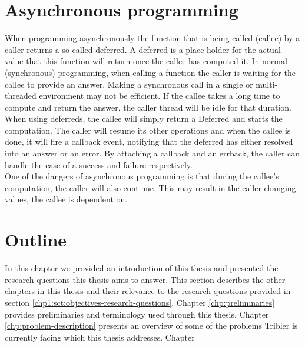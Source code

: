 \section{Asynchronous programming}
\label{sec:async-programming}

When programming asynchronously the function that is being called (callee) by a caller returns a so-called deferred.
A deferred is a place holder for the actual value that this function will return once the callee has computed it.
In normal (synchronous) programming, when calling a function the caller is waiting for the callee to provide an answer. 
Making a synchronous call in a single or multi-threaded environment may not be efficient.
If the callee takes a long time to compute and return the answer, the caller thread will be idle for that duration.
When using deferreds, the callee will simply return a Deferred and starts the computation.
The caller will resume its other operations and when the callee is done, it will fire a callback event, notifying that the deferred has either resolved into an answer or an error.
By attaching a callback and an errback, the caller can handle the case of a success and failure respectively.\\

One of the dangers of asynchronous programming is that during the callee's computation, the caller will also continue.
This may result in the caller changing values, the callee is dependent on.


\section{Outline}
In this chapter we provided an introduction of this thesis and presented the research questions this thesis aims to answer. 
This section describes the other chapters in this thesis and their relevance to the research questions provided in section \ref{chp1:sct:objectives-research-questions}.
Chapter \ref{chp:preliminaries} provides preliminaries and terminology used through this thesis.
Chapter \ref{chp:problem-description} presents an overview of some of the problems Tribler is currently facing which this thesis addresses.
Chapter 
